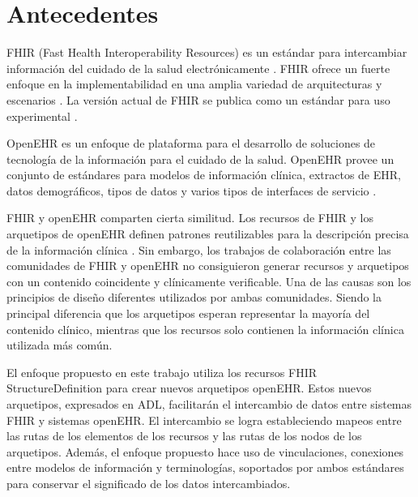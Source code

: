 \section{Antecedentes}

FHIR (Fast Health Interoperability Resources) es un estándar para intercambiar información del cuidado de la salud electrónicamente \cite{FHIRClinician}. FHIR ofrece un fuerte enfoque en la implementabilidad en una amplia variedad de arquitecturas y escenarios \cite{FHIRExecutive}. La versión actual de FHIR se publica como un estándar para uso experimental \cite{FHIR}.

OpenEHR es un enfoque de plataforma para el desarrollo de soluciones de tecnología de la información para el cuidado de la salud. OpenEHR provee un conjunto de estándares para modelos de información clínica, extractos de EHR, datos demográficos, tipos de datos y varios tipos de interfaces de servicio \cite{openEHRWhitePaper}.





FHIR y openEHR comparten cierta similitud. Los recursos de FHIR y los arquetipos de openEHR definen patrones reutilizables para la descripción precisa de la información clínica \cite{Bosca15}. Sin embargo, los trabajos de colaboración entre las comunidades de FHIR y openEHR \cite{Collaboration} no consiguieron generar recursos y arquetipos con un contenido coincidente y clínicamente verificable. Una de las causas son los principios de diseño diferentes utilizados por ambas comunidades. Siendo la principal diferencia que los arquetipos esperan representar la mayoría del contenido clínico, mientras que los recursos solo contienen la información clínica utilizada más común.

El enfoque propuesto en este trabajo utiliza los recursos FHIR StructureDefinition para crear nuevos arquetipos openEHR. Estos nuevos arquetipos, expresados en ADL, facilitarán el intercambio de datos entre sistemas FHIR y sistemas openEHR. El intercambio se logra estableciendo mapeos entre las rutas de los elementos de los recursos y las rutas de los nodos de los arquetipos. Además, el enfoque propuesto hace uso de vinculaciones, conexiones entre modelos de información y terminologías, soportados por ambos estándares para conservar el significado de los datos intercambiados. 
